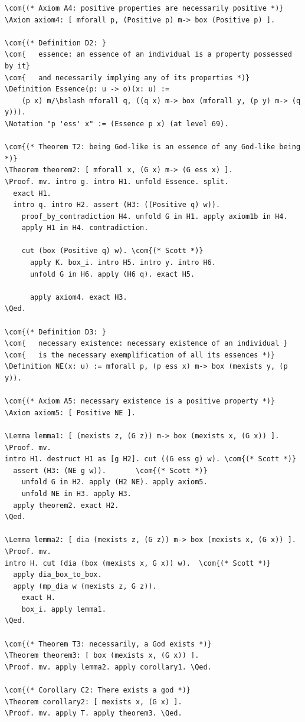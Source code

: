 \documentclass{llncs}
\newcommand{\red}[1]{\textcolor[rgb]{1,0,0}{#1}}
\newcommand{\blue}[1]{\textcolor[rgb]{0,0,1}{#1}}
\newcommand{\brown}[1]{\textcolor[rgb]{0.8,0.6,0.4}{#1}}
\newcommand{\Axiom}{\red{Axiom}}
\newcommand{\Lemma}{\red{Lemma}}
\newcommand{\Theorem}{\red{Theorem}}
\newcommand{\Definition}{\red{Definition}}
\newcommand{\Notation}{\blue{Notation}}
\newcommand{\Proof}{\blue{Proof}}
\newcommand{\Qed}{\blue{Qed}}
\newcommand{\com}[1]{\brown{#1}}
\newcommand{\bslash}{\symbol{92}}
\begin{document}
\begin{Verbatim}[commandchars=\\\{\},fontsize=\verbsize]
\com{(* Axiom A4: positive properties are necessarily positive *)}
\Axiom axiom4: [ mforall p, (Positive p) m-> box (Positive p) ].

\com{(* Definition D2: }
\com{   essence: an essence of an individual is a property possessed by it} 
\com{   and necessarily implying any of its properties *)}
\Definition Essence(p: u -> o)(x: u) := 
    (p x) m/\bslash mforall q, ((q x) m-> box (mforall y, (p y) m-> (q y))).
\Notation "p 'ess' x" := (Essence p x) (at level 69).

\com{(* Theorem T2: being God-like is an essence of any God-like being *)}
\Theorem theorem2: [ mforall x, (G x) m-> (G ess x) ].
\Proof. mv. intro g. intro H1. unfold Essence. split.
  exact H1.
  intro q. intro H2. assert (H3: ((Positive q) w)).
    proof_by_contradiction H4. unfold G in H1. apply axiom1b in H4. 
    apply H1 in H4. contradiction. 
    
    cut (box (Positive q) w). \com{(* Scott *)}
      apply K. box_i. intro H5. intro y. intro H6. 
      unfold G in H6. apply (H6 q). exact H5.

      apply axiom4. exact H3.
\Qed.

\com{(* Definition D3: }
\com{   necessary existence: necessary existence of an individual }
\com{   is the necessary exemplification of all its essences *)}
\Definition NE(x: u) := mforall p, (p ess x) m-> box (mexists y, (p y)).

\com{(* Axiom A5: necessary existence is a positive property *)}
\Axiom axiom5: [ Positive NE ].

\Lemma lemma1: [ (mexists z, (G z)) m-> box (mexists x, (G x)) ].
\Proof. mv. 
intro H1. destruct H1 as [g H2]. cut ((G ess g) w). \com{(* Scott *)}
  assert (H3: (NE g w)).       \com{(* Scott *)}
    unfold G in H2. apply (H2 NE). apply axiom5.
    unfold NE in H3. apply H3.
  apply theorem2. exact H2.
\Qed.

\Lemma lemma2: [ dia (mexists z, (G z)) m-> box (mexists x, (G x)) ].
\Proof. mv. 
intro H. cut (dia (box (mexists x, G x)) w).  \com{(* Scott *)}
  apply dia_box_to_box.
  apply (mp_dia w (mexists z, G z)).
    exact H.
    box_i. apply lemma1.
\Qed.

\com{(* Theorem T3: necessarily, a God exists *)}
\Theorem theorem3: [ box (mexists x, (G x)) ].
\Proof. mv. apply lemma2. apply corollary1. \Qed.

\com{(* Corollary C2: There exists a god *)}
\Theorem corollary2: [ mexists x, (G x) ].
\Proof. mv. apply T. apply theorem3. \Qed.
\end{Verbatim}
\end{document}
